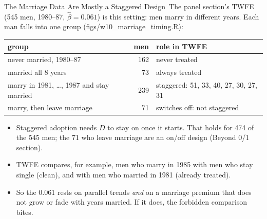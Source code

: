\documentclass[aspectratio=169,11pt,xcolor=dvipsnames]{beamer}
\newcommand{\srcp}[1]{{\scriptsize\color{gray}(#1)}}
\newcommand{\core}{\,\raisebox{0.6pt}{\textcolor{corestar}{$\bigstar$}}}
\begin{document}
\begin{frame}{The Marriage Data Are Mostly a Staggered Design\core}
The panel section's TWFE (545 men, 1980--87, $\hat\beta = 0.061$) is this setting: men marry in
different years. Each man falls into one group \srcp{figs/w10\_marriage\_timing.R}:
\vskip4pt
\begin{center}\small
\renewcommand{\arraystretch}{1.12}
\begin{tabular}{@{}lrl@{}}
\toprule
group & men & role in TWFE \\
\midrule
never married, 1980--87 & 162 & never treated \\
married all 8 years & 73 & always treated \\
marry in 1981, \dots, 1987 and stay married & 239 & staggered: 51, 33, 40, 27, 30, 27, 31 \\
marry, then leave marriage & 71 & switches off: not staggered \\
\bottomrule
\end{tabular}
\end{center}
\begin{itemize}\itemsep2pt
  \item Staggered adoption needs $D$ to stay on once it starts. That holds for 474 of the 545
        men; the 71 who leave marriage are an on/off design (Beyond 0/1 section).
  \item TWFE compares, for example, men who marry in 1985 with men who stay single
        (clean), and with men who married in 1981 (already treated).
  \item So the 0.061 rests on parallel trends \emph{and} on a marriage premium that does not
        grow or fade with years married. If it does, the forbidden comparison bites.
\end{itemize}
\end{frame}
\end{document}
